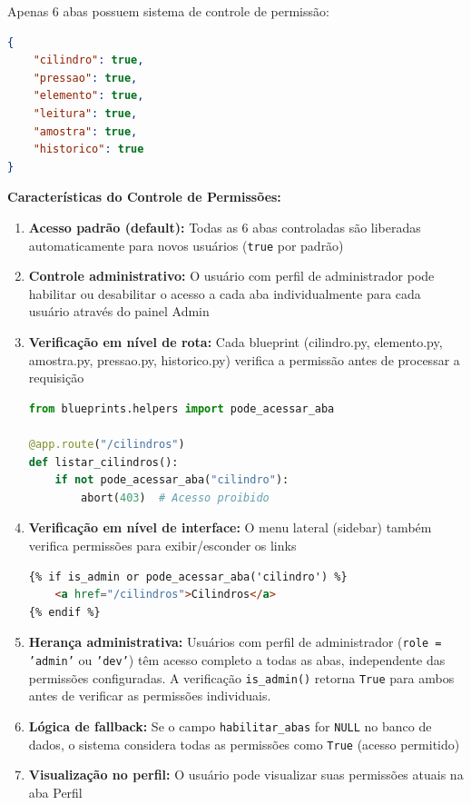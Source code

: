 \documentclass[12pt,a4paper]{article}
\begin{document}
Apenas 6 abas possuem sistema de controle de permissão:

\begin{lstlisting}[language=JSON, caption=JSON de Permissões]
{
    "cilindro": true,
    "pressao": true,
    "elemento": true,
    "leitura": true,
    "amostra": true,
    "historico": true
}
\end{lstlisting}

\textbf{Características do Controle de Permissões:}

\begin{enumerate}
\item \textbf{Acesso padrão (default):} Todas as 6 abas controladas são liberadas automaticamente para novos usuários (\texttt{true} por padrão)

\item \textbf{Controle administrativo:} O usuário com perfil de administrador pode habilitar ou desabilitar o acesso a cada aba individualmente para cada usuário através do painel Admin

\item \textbf{Verificação em nível de rota:} Cada blueprint (cilindro.py, elemento.py, amostra.py, pressao.py, historico.py) verifica a permissão antes de processar a requisição

\begin{lstlisting}[language=Python, caption=Verificação de Permissão em Rota]
from blueprints.helpers import pode_acessar_aba

@app.route("/cilindros")
def listar_cilindros():
    if not pode_acessar_aba("cilindro"):
        abort(403)  # Acesso proibido
\end{lstlisting}

\item \textbf{Verificação em nível de interface:} O menu lateral (sidebar) também verifica permissões para exibir/esconder os links

\begin{lstlisting}[language=HTML, caption=Verificação de Permissão no Template]
{% if is_admin or pode_acessar_aba('cilindro') %}
    <a href="/cilindros">Cilindros</a>
{% endif %}
\end{lstlisting}

\item \textbf{Herança administrativa:} Usuários com perfil de administrador (\texttt{role = 'admin'} ou \texttt{'dev'}) têm acesso completo a todas as abas, independente das permissões configuradas. A verificação \texttt{is\_admin()} retorna \texttt{True} para ambos antes de verificar as permissões individuais.

\item \textbf{Lógica de fallback:} Se o campo \texttt{habilitar\_abas} for \texttt{NULL} no banco de dados, o sistema considera todas as permissões como \texttt{True} (acesso permitido)

\item \textbf{Visualização no perfil:} O usuário pode visualizar suas permissões atuais na aba Perfil
\end{enumerate}
\end{document}
